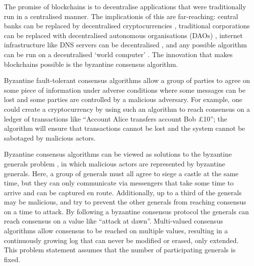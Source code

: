 
The promise of blockchains is to decentralise applications that were traditionally run in a centralised manner. The implicationis of this are far-reaching: central banks can be replaced by decentralised cryptocurrencies \cite{nakamotoBitcoinPeertoPeerElectronic2008,perniceCryptocurrency2021}, traditional corporations can be replaced with decentralised autonomous organisations (DAOs) \cite{hassanDecentralizedAutonomousOrganization2021,ethereumWhite}, internet infrastructure like DNS servers can be decentralised \cite{EthereumNameService}, and any possible algorithm can be run on a decentralised `world computer' \cite{ethereumWhite,ethereumYellow}. The innovation that makes blockchains possible is the byzantine consensus algorithm.

Byzantine fault-tolerant consensus algorithms allow a group of parties to agree on some piece of information under adverse conditions where some messages can be lost and some parties are controlled by a malicious adversary. For example, one could create a cryptocurrency by using such an algorithm to reach consensus on a ledger of transactions like ``Account Alice transfers account Bob £10''; the algorithm will ensure that transactions cannot be lost and the system cannot be sabotaged by malicious actors.

Byzantine consensus algorithms can be viewed as solutions to the byzantine generals problem \cite{lamportByzantineGeneralsProblem1982}, in which malicious actors are represented by byzantine generals. Here, a group of generals must all agree to siege a castle at the same time, but they can only communicate via messengers that take some time to arrive and can be captured en route. Additionally, up to a third of the generals may be malicious, and try to prevent the other generals from reaching consensus on a time to attack. By following a byzantine consensus protocol the generals can reach consensus on a value like ``attack at dawn''. Multi-valued consensus algorithms allow consensus to be reached on multiple values, resulting in a continuously growing log that can never be modified or erased, only extended. This problem statement assumes that the number of participating generals is fixed.

